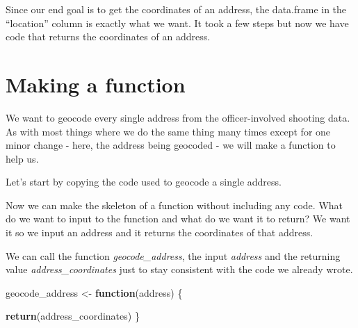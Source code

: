 \documentclass[
  12pt,
]{book}
\newenvironment{Shaded}{\begin{snugshade}}{\end{snugshade}}
\newcommand{\CommentTok}[1]{\textcolor[rgb]{0.56,0.35,0.01}{\textit{#1}}}
\newcommand{\ControlFlowTok}[1]{\textcolor[rgb]{0.13,0.29,0.53}{\textbf{#1}}}
\newcommand{\DecValTok}[1]{\textcolor[rgb]{0.00,0.00,0.81}{#1}}
\newcommand{\KeywordTok}[1]{\textcolor[rgb]{0.13,0.29,0.53}{\textbf{#1}}}
\newcommand{\NormalTok}[1]{#1}
\newcommand{\OperatorTok}[1]{\textcolor[rgb]{0.81,0.36,0.00}{\textbf{#1}}}
\newcommand{\StringTok}[1]{\textcolor[rgb]{0.31,0.60,0.02}{#1}}
\begin{document}
Since our end goal is to get the coordinates of an address, the data.frame in the ``location'' column is exactly what we want. It took a few steps but now we have code that returns the coordinates of an address.

\hypertarget{making-a-function}{%
\section{Making a function}\label{making-a-function}}

We want to geocode every single address from the officer-involved shooting data. As with most things where we do the same thing many times except for one minor change - here, the address being geocoded - we will make a function to help us.

Let's start by copying the code used to geocode a single address.

\begin{Shaded}
\end{Shaded}

Now we can make the skeleton of a function without including any code. What do we want to input to the function and what do we want it to return? We want it so we input an address and it returns the coordinates of that address.

We can call the function \emph{geocode\_address}, the input \emph{address} and the returning value \emph{address\_coordinates} just to stay consistent with the code we already wrote.

\begin{Shaded}
\begin{Highlighting}[]
\NormalTok{geocode\_address <{-}}\StringTok{ }\ControlFlowTok{function}\NormalTok{(address) \{}
   
   \KeywordTok{return}\NormalTok{(address\_coordinates)}
\NormalTok{\}}
\end{Highlighting}
\end{Shaded}
\end{document}
